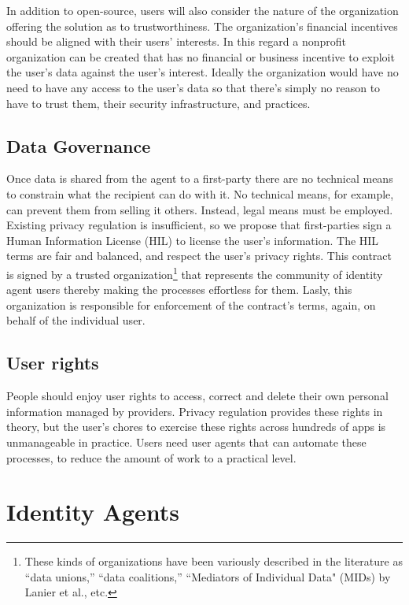 \documentclass[11pt, oneside]{article}   	%
\begin{document}
In addition to open-source, users will also consider the nature of the organization offering the solution as to trustworthiness. The organization's financial incentives should be aligned with their users' interests. In this regard a nonprofit organization can be created that has no financial or business incentive to exploit the user's data against the user's interest. Ideally the organization would have no need to have any access to the user's data so that there's simply no reason to have to trust them, their security infrastructure, and practices.

\subsection{Data Governance}

Once data is shared from the agent to a first-party there are no technical means to constrain what the recipient can do with it. No technical means, for example, can prevent them from selling it others. Instead, legal means must be employed. Existing privacy regulation is insufficient, so we propose that first-parties sign a Human Information License (HIL) to license the user's information. The HIL terms are fair and balanced, and respect the user's privacy rights. This contract is signed by a trusted organization\footnote{These kinds of organizations have been variously described in the literature as ``data unions,'' ``data coalitions,'' ``Mediators of Individual Data" (MIDs) by Lanier et al.\cite{Lanier2018}, etc.} that represents the community of identity agent users thereby making the processes effortless for them. Lasly, this organization is responsible for enforcement of the contract's terms, again, on behalf of the individual user.

\subsection{User rights}

People should enjoy user rights to access, correct and delete their own personal information managed by providers. Privacy regulation provides these rights in theory, but the user's chores to exercise these rights across hundreds of apps is unmanageable in practice. Users need user agents that can automate these processes, to reduce the amount of work to a practical level. 

\section{Identity Agents} 
\end{document}
